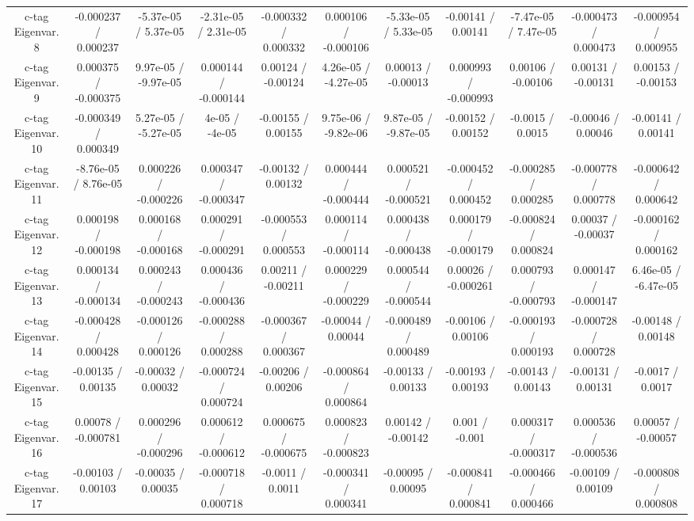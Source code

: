\begin{table}[htbp]
\begin{center}
\begin{tabular}{|c|c|c|c|c|c|c|c|c|c|c|}
  c-tag Eigenvar. 8 & -0.000237 / 0.000237 & -5.37e-05 / 5.37e-05 & -2.31e-05 / 2.31e-05 & -0.000332 / 0.000332 & 0.000106 / -0.000106 & -5.33e-05 / 5.33e-05 & -0.00141 / 0.00141 & -7.47e-05 / 7.47e-05 & -0.000473 / 0.000473 & -0.000954 / 0.000955 \\ 
  c-tag Eigenvar. 9 & 0.000375 / -0.000375 & 9.97e-05 / -9.97e-05 & 0.000144 / -0.000144 & 0.00124 / -0.00124 & 4.26e-05 / -4.27e-05 & 0.00013 / -0.00013 & 0.000993 / -0.000993 & 0.00106 / -0.00106 & 0.00131 / -0.00131 & 0.00153 / -0.00153 \\ 
  c-tag Eigenvar. 10 & -0.000349 / 0.000349 & 5.27e-05 / -5.27e-05 & 4e-05 / -4e-05 & -0.00155 / 0.00155 & 9.75e-06 / -9.82e-06 & 9.87e-05 / -9.87e-05 & -0.00152 / 0.00152 & -0.0015 / 0.0015 & -0.00046 / 0.00046 & -0.00141 / 0.00141 \\ 
  c-tag Eigenvar. 11 & -8.76e-05 / 8.76e-05 & 0.000226 / -0.000226 & 0.000347 / -0.000347 & -0.00132 / 0.00132 & 0.000444 / -0.000444 & 0.000521 / -0.000521 & -0.000452 / 0.000452 & -0.000285 / 0.000285 & -0.000778 / 0.000778 & -0.000642 / 0.000642 \\ 
  c-tag Eigenvar. 12 & 0.000198 / -0.000198 & 0.000168 / -0.000168 & 0.000291 / -0.000291 & -0.000553 / 0.000553 & 0.000114 / -0.000114 & 0.000438 / -0.000438 & 0.000179 / -0.000179 & -0.000824 / 0.000824 & 0.00037 / -0.00037 & -0.000162 / 0.000162 \\ 
  c-tag Eigenvar. 13 & 0.000134 / -0.000134 & 0.000243 / -0.000243 & 0.000436 / -0.000436 & 0.00211 / -0.00211 & 0.000229 / -0.000229 & 0.000544 / -0.000544 & 0.00026 / -0.000261 & 0.000793 / -0.000793 & 0.000147 / -0.000147 & 6.46e-05 / -6.47e-05 \\ 
  c-tag Eigenvar. 14 & -0.000428 / 0.000428 & -0.000126 / 0.000126 & -0.000288 / 0.000288 & -0.000367 / 0.000367 & -0.00044 / 0.00044 & -0.000489 / 0.000489 & -0.00106 / 0.00106 & -0.000193 / 0.000193 & -0.000728 / 0.000728 & -0.00148 / 0.00148 \\ 
  c-tag Eigenvar. 15 & -0.00135 / 0.00135 & -0.00032 / 0.00032 & -0.000724 / 0.000724 & -0.00206 / 0.00206 & -0.000864 / 0.000864 & -0.00133 / 0.00133 & -0.00193 / 0.00193 & -0.00143 / 0.00143 & -0.00131 / 0.00131 & -0.0017 / 0.0017 \\ 
  c-tag Eigenvar. 16 & 0.00078 / -0.000781 & 0.000296 / -0.000296 & 0.000612 / -0.000612 & 0.000675 / -0.000675 & 0.000823 / -0.000823 & 0.00142 / -0.00142 & 0.001 / -0.001 & 0.000317 / -0.000317 & 0.000536 / -0.000536 & 0.00057 / -0.00057 \\ 
  c-tag Eigenvar. 17 & -0.00103 / 0.00103 & -0.00035 / 0.00035 & -0.000718 / 0.000718 & -0.0011 / 0.0011 & -0.000341 / 0.000341 & -0.00095 / 0.00095 & -0.000841 / 0.000841 & -0.000466 / 0.000466 & -0.00109 / 0.00109 & -0.000808 / 0.000808 \\ 

\end{tabular}
\end{center}
\end{table}
